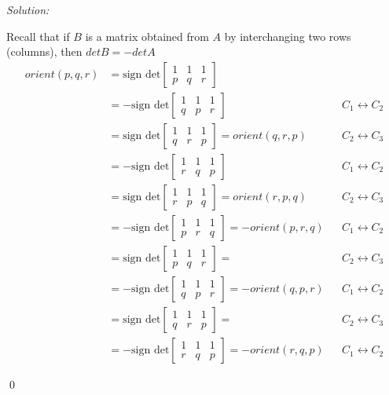 \documentclass[a4paper, 8pt, oneside]{article}
\newenvironment{sol}
    {\emph{Solution:}
    }
    {
    \qed
    }
\begin{document}
\begin{enumerate}
\begin{enumerate}
\begin{sol}
Recall that if $B$ is a matrix obtained from $A$ by interchanging two rows (columns), then $det B = - det A$
\begin{align*}
orient(p,q,r) &=  
\text{sign det}
\begin{bmatrix}
    1 &1 & 1 \\
    p &q & r
\end{bmatrix}\\&=
- \text{sign det}
\begin{bmatrix}
    1 &1 & 1 \\
   q &p & r
\end{bmatrix} && C_1 \leftrightarrow C_2 \\&=
\text{sign det}
\begin{bmatrix}
    1 &1 & 1 \\
   q &r & p
\end{bmatrix} =  orient(q,r,p) && C_2 \leftrightarrow C_3 \\&=
-\text{sign det}
\begin{bmatrix}
    1 &1 & 1 \\
   r &q & p
\end{bmatrix} && C_1 \leftrightarrow C_2 \\&=
\text{sign det}
\begin{bmatrix}
    1 &1 & 1 \\
   r &p & q
\end{bmatrix} =  orient(r,p,q) && C_2 \leftrightarrow C_3 \\&=
- \text{sign det}
\begin{bmatrix}
    1 &1 & 1 \\
   p &r & q
\end{bmatrix} =  - orient(p,r,q) && C_1 \leftrightarrow C_2 \\&=
\text{sign det}
\begin{bmatrix}
    1 &1 & 1 \\
   p &q & r
\end{bmatrix} = && C_2 \leftrightarrow C_3 \\&=
- \text{sign det}
\begin{bmatrix}
    1 &1 & 1 \\
   q &p & r
\end{bmatrix} =  - orient(q,p,r)  && C_1 \leftrightarrow C_2 \\&=
\text{sign det}
\begin{bmatrix}
    1 &1 & 1 \\
   q &r & p
\end{bmatrix}  = && C_2 \leftrightarrow C_3 \\&=
- \text{sign det}
\begin{bmatrix}
    1 &1 & 1 \\
   r &q & p
\end{bmatrix} =  - orient(r,q,p) && C_1 \leftrightarrow C_2
\end{align*}
\end{sol}


\end{enumerate}
\end{enumerate}
\end{document}
